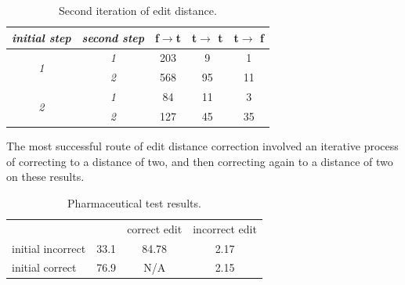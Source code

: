 \begin{table}
\renewcommand{\arraystretch}{1.6}
\setlength{\tabcolsep}{0.7em}
\caption{Second iteration of edit distance.}
\label{table:lev-distance2}
\centering
\begin{tabular}{@{}ccccc@{}}
\toprule
\textit{initial step}                            & \textit{second step}            & \textbf{f$\rightarrow$t} & \textbf{t$\rightarrow$ t} & \textbf{t$\rightarrow$ f} \\ \midrule
\multicolumn{1}{c|}{\multirow{2}{*}{\textit{1}}} & \multicolumn{1}{c|}{\textit{1}} & \multicolumn{1}{c|}{203} & \multicolumn{1}{c|}{9}    & 1                         \\
\multicolumn{1}{c|}{}                            & \multicolumn{1}{c|}{\textit{2}} & \multicolumn{1}{c|}{568} & \multicolumn{1}{c|}{95}   & 11                        \\ \midrule
\multicolumn{1}{c|}{\multirow{2}{*}{\textit{2}}} & \multicolumn{1}{c|}{\textit{1}} & \multicolumn{1}{c|}{84}  & \multicolumn{1}{c|}{11}   & 3                         \\
\multicolumn{1}{c|}{}                            & \multicolumn{1}{c|}{\textit{2}} & \multicolumn{1}{c|}{127} & \multicolumn{1}{c|}{45}   & 35                        \\ \bottomrule
\end{tabular}
\end{table}



The most successful route of edit distance correction involved an iterative process of correcting to a distance of two, and then correcting again to a distance of two on these results. 

\begin{table}
\renewcommand{\arraystretch}{1.6}
\setlength{\tabcolsep}{0.7em}
\caption{Pharmaceutical test results.}
\label{table:pharmaceutical-testing}
\centering
\begin{tabular}{@{}lccc@{}}
\toprule
                  &                           & correct edit & incorrect  edit \\ \cmidrule(l){3-4} 
initial incorrect & \multicolumn{1}{l|}{33.1} & 84.78        & 2.17            \\
initial correct   & \multicolumn{1}{l|}{76.9} & N/A          & 2.15            \\ \bottomrule
\end{tabular}
\end{table}

